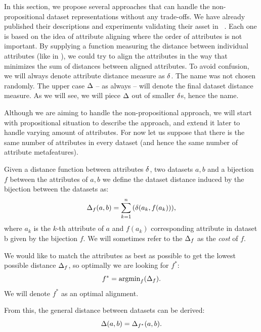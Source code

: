 In this section, we propose several approaches that can handle the non-propositional dataset representations without any trade-offs. We have already published their descriptions and experiments validating their asset in ~\cite{diplomka,jaIcannga2013,SSCI2014,jaCEC2015,jaSSCI2015}. Each one is based on the idea of attribute aligning where the order of attributes is not important. By supplying a function measuring the distance between individual attributes (like in \cite{RepresentationalIssuesInMetalearning}), we could try to align the attributes in the way that minimizes the sum of distances between aligned attributes. To avoid confusion, we will always denote attribute distance measure as $\delta$. The name was not chosen randomly. The upper case $\Delta$ -- as always -- will denote the final dataset distance measure. As we will see, we will piece $\Delta$ out of smaller $\delta$s, hence the name.

Although we are aiming to handle the non-propositional approach, we will start with propositional situation to describe the approach, and extend it later to handle varying amount of attributes.
For now let us suppose that there is the same number of attributes in every dataset (and hence the same number of attribute metafeatures).

\begin{definition}
Given a distance function between attributes $\delta$, two datasets $a,b$ and a bijection $f$ between the attributes of $a,b$ we define the dataset distance induced by the bijection between the datasets as:
\begin{equation}
\Delta_f(a,b)=\sum_{k=1}^{n}{(\delta(a_k,f(a_k)))},
\label{eq:attdist}
\end{equation}
where $a_k$ is the $k$-th attribute of $a$ and $f(a_k)$ corresponding attribute in dataset b given by the bijection $f$.
We will sometimes refer to the $\Delta_f$ as the \emph{cost} of $f$.
\end{definition}
We would like to match the attributes as best as possible to get the lowest possible distance $\Delta_f$, so optimally we are looking for $f^*$:
\begin{equation}
f^*= \mathrm{argmin}_f(\Delta_f).
\label{eq:argmin}
\end{equation}
We will denote $f^*$ as an optimal alignment.

From this, the general distance between datasets can be derived:
\begin{equation}
\Delta(a,b) = \Delta_{f^*}(a,b).
\end{equation}

